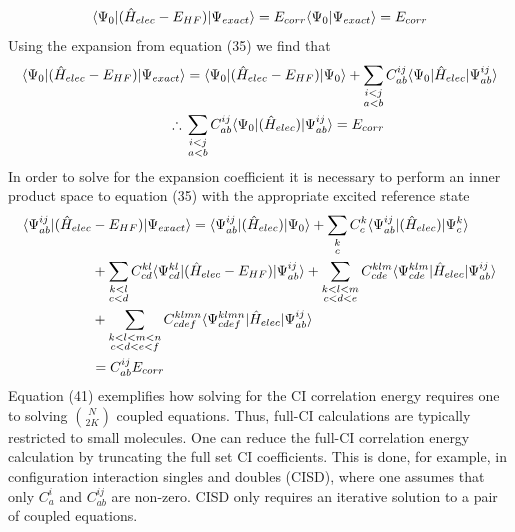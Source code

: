         \begin{equation}
      	  \langle\Psi_0 |(\hat{H}_{elec} - E_{HF})| \Psi_{exact} \rangle = E_{corr}\langle\Psi_0|\Psi_{exact}\rangle = E_{corr}
        \end{equation}
      Using the expansion from equation (35) we find that 
        \begin{equation}
        \begin{aligned}
        \langle\Psi_0 |(\hat{H}_{elec} - E_{HF})| \Psi_{exact} \rangle &= \langle\Psi_0 |(\hat{H}_{elec} - E_{HF})| \Psi_0 \rangle + \sum_{\substack{i<j \\ a<b}}C^{ij}_{ab}\langle\Psi_0 |\hat{H}_{elec}| \Psi^{ij}_{ab} \rangle  \\
        \therefore{}&\sum_{\substack{i<j \\ a<b}}C^{ij}_{ab}\langle\Psi_0 |(\hat{H}_{elec})| \Psi^{ij}_{ab} \rangle  = E_{corr}
        \end{aligned}
        \end{equation}
      In order to solve for the expansion coefficient it is necessary to perform an inner product space to equation (35) with the appropriate excited reference state
        \begin{equation}
        	\begin{aligned}
        		\langle\Psi^{ij}_{ab} |(\hat{H}_{elec} &- E_{HF})| \Psi_{exact} \rangle = \langle\Psi^{ij}_{ab} |(\hat{H}_{elec} )| \Psi_0 \rangle +  \sum_{\substack{k\\c}} C^k_c\langle\Psi^{ij}_{ab} |(\hat{H}_{elec} )| \Psi^k_c \rangle \\
      		&+  \sum_{\substack{k<l \\ c<d}}C^{kl}_{cd}\langle\Psi^{kl}_{cd} |(\hat{H}_{elec}-E_{HF})| \Psi^{ij}_{ab} \rangle  +  \sum_{\substack{k<l<m \\ c<d<e}}C^{klm}_{cde}\langle\Psi^{klm}_{cde} |\hat{H}_{elec}| \Psi^{ij}_{ab} \rangle \\
      		&+  \sum_{\substack{k<l<m<n \\ c<d<e<f}}C^{klmn}_{cdef}\langle\Psi^{klmn}_{cdef} |\hat{H}_{elec}| \Psi^{ij}_{ab} \rangle \\
        		&= C^{ij}_{ab}E_{corr}
        	\end{aligned}
        \end{equation}
      Equation (41) exemplifies how solving for the CI correlation energy requires one to solving $\binom{N}{2K}$ coupled equations.  Thus, full-CI calculations are typically restricted to small molecules. One can reduce the full-CI correlation energy calculation by truncating the full set CI coefficients.  This is done, for example, in configuration interaction singles and doubles (CISD), where one assumes that only $C^i_a$ and $C^{ij}_{ab}$ are non-zero.  CISD only requires an iterative solution to a pair of coupled equations.  \\
